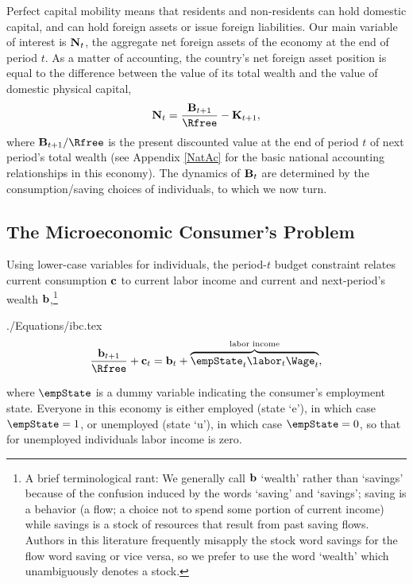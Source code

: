 \documentclass[titlepage]{\econtex}\newcommand{\texname}{cjSOE}
\begin{document}
Perfect capital mobility means that residents and non-residents can
hold domestic capital, and can hold foreign assets or issue foreign
liabilities. Our main variable of interest is $\mathbf{N}_t$, the aggregate
net foreign assets of the economy at the end of period $t$. As a
matter of accounting, the country's net foreign asset position is
equal to the difference between the value of its total wealth and the value of domestic physical capital,
\begin{equation}
\NFALev_t = \frac{\BLev_{t+1}}{\Rfree} - \KLev_{t+1},
\label{eq:NFALev}
\end{equation}
where $\BLev_{t+1}/\Rfree$ is the present discounted value at the end of period $t$ of next
period's total wealth (see Appendix \ref{NatAc} for the basic national accounting relationships in this economy). The dynamics of $\mathbf{B}_t$ are determined by
the consumption/saving choices of individuals, to which we now turn.

\subsection{The Microeconomic Consumer's Problem}

Using lower-case variables for individuals, the period-$t$ budget
constraint relates current consumption $\mathbf{c}$ to
current labor income and current and next-period's wealth $\mathbf{b}$,\footnote{A
  brief terminological rant: We generally call $\mathbf{b}$ `wealth' rather
  than `savings' because of the confusion induced by the words
  `saving' and `savings'; saving is a behavior (a flow; a choice not
  to spend some portion of current income) while savings is a stock of
  resources that result from past saving flows.  Authors in this
  literature frequently misapply the stock word savings for the flow
  word saving or vice versa, so we prefer to use the word `wealth'
  which unambiguously denotes a stock.}
\begin{verbatimwrite}{./Equations/ibc.tex}
\begin{equation}
\frac{\bLev_{t+1}}{\Rfree}+ \cLev_{t}=\bLev_{t}+\overbrace{\empState_{t} \labor_{t} \Wage_t}^{\text{labor income}},
\label{eq:ibc}
\end{equation}
\end{verbatimwrite}

where $\empState$ is a dummy variable indicating the consumer's
employment state.
Everyone in this economy is either employed (state `e'),
in which case $\empState = 1$, or unemployed (state
`u'), in which case $\empState=0$, so that for unemployed individuals labor income is zero.
\end{document}
